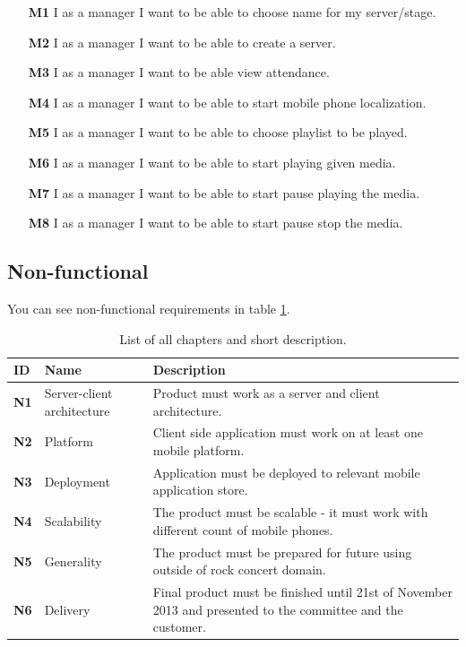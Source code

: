 \begin{enumerate}
	\item[\textbf{M1}] \label{req_M1}
		I as a manager I want to be able to choose name for my server/stage.
		
	\item[\textbf{M2}] \label{req_M2}
		I as a manager I want to be able to create a server.
		
	\item[\textbf{M3}] \label{req_M3}
		I as a manager I want to be able view attendance.
	
	\item[\textbf{M4}] \label{req_M4}
		I as a manager I want to be able to start mobile phone localization.
		
	\item[\textbf{M5}] \label{req_M5}
		I as a manager I want to be able to choose playlist to be played.
		
	\item[\textbf{M6}] \label{req_M6}
		I as a manager I want to be able to start playing given media.
		
	\item[\textbf{M7}] \label{req_M7}
		I as a manager I want to be able to start pause playing the media.
	\item[\textbf{M8}] \label{req_M8}
		I as a manager I want to be able to start pause stop the media.
\end{enumerate}

\subsection{Non-functional}
You can see non-functional requirements in table \ref{tab:req_nonfunc}.

\begin{table}[!h]\centering
\caption{List of all chapters and short description. }
\label{tab:req_nonfunc}
\def\arraystretch{1.3}
\begin{tabularx}{\textwidth}{llX}
\toprule[1mm]
\textbf{ID} & Name & Description\\
\midrule
\textbf{N1} & Server-client architecture & Product must work as a server and client architecture.\\
\textbf{N2} & Platform & Client side application must work on at least one mobile platform.\\
\textbf{N3} & Deployment & Application must be deployed to relevant mobile application store.\\
\textbf{N4} & Scalability & The product must be scalable - it must work with different count of mobile phones.\\
\textbf{N5} & Generality & The product must be prepared for future using outside of rock concert domain.\\
\textbf{N6} & Delivery & Final product must be finished until 21st of November 2013 and presented to the committee and the customer.\\
\bottomrule[1mm]

\end{tabularx}
\end{table}

